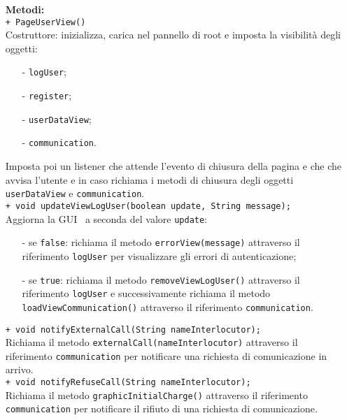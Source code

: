 {\begin{sloppypar}
{{\begin{itemize}
				\texttt{- IUserDataView userDataView}: riferimento alla classe \texttt{UserDataView}.\\
				
				\texttt{- ICommunicationView communication}: riferimento alla classe \texttt{CommunicationView}.\\
			
			\item[] \textbf{Metodi:}\\
				\texttt{+ PageUserView()}\\
				Costruttore: inizializza, carica nel pannello di root e imposta la visibilità degli oggetti:
				\begin{itemize}
					\item[-] \texttt{logUser};
					\item[-] \texttt{register};
					\item[-] \texttt{userDataView};
					\item[-] \texttt{communication}.
				\end{itemize}
				Imposta poi un listener che attende l'evento di chiusura della pagina e che che avvisa l'utente e in caso richiama i metodi di chiusura degli oggetti \texttt{userDataView} e \texttt{communication}.\\
				
				\texttt{+ void updateViewLogUser(boolean update, String message);}\\
				Aggiorna la GUI\g~ a seconda del valore \texttt{update}:
				\begin{itemize}
					\item[-] se \texttt{false}: richiama il metodo \texttt{errorView(message)} attraverso il riferimento \texttt{logUser} per visualizzare gli errori di autenticazione;
					\item[-] se \texttt{true}: richiama il metodo \texttt{removeViewLogUser()} attraverso il riferimento \texttt{logUser} e successivamente richiama il metodo \texttt{loadViewCommunication()} attraverso il riferimento \texttt{communication}.\\
				\end{itemize}
				
				\texttt{+ void notifyExternalCall(String nameInterlocutor);}\\
				Richiama il metodo \texttt{externalCall(nameInterlocutor)} attraverso il riferimento \texttt{communication} per notificare una richiesta di comunicazione in arrivo.\\
				
				\texttt{+ void notifyRefuseCall(String nameInterlocutor);}\\
				Richiama il metodo \texttt{graphicInitialCharge()} attraverso il riferimento \texttt{communication} per notificare il rifiuto di una richiesta di comunicazione.\\
				

\end{itemize}}}
\end{sloppypar}}
